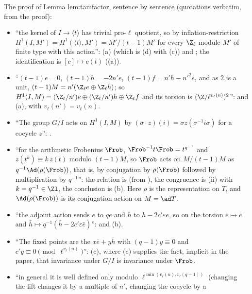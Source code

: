 \begin{paperlink}\label{pl:cohomology:tamfactor}
The proof of Lemma lem:tamfactor, sentence by sentence (quotations verbatim, from the proof):
\begin{itemize}
\item ``the kernel of $I\to\langle t\rangle$ has trivial pro-$\ell$ quotient, so by inflation-restriction $H^1(I,M')=H^1(\langle t\rangle,M')=M'/(t-1)M'$ for every
$\Z_\ell$-module $M'$ of finite type with this action'': (a) (which is (d) with
(c)) and ; the identification is $[c]\mapsto c(t)$ ((a)).
\item ``$(t-1)e=0$, $(t-1)h=-2n'e$, $(t-1)f=n'h-n'^2e$, and as $2$ is a unit, $(t-1)M=n'(\Z_\ell e\oplus\Z_\ell h)$; so
$H^1(I,M)=(\Z_\ell/n')\bar e\oplus(\Z_\ell/n')\bar h\oplus\Z_\ell\bar f$ and its torsion is $(\Z/\ell^{v_\ell(n)})^2$'':  and
(a), with $v_\ell(n')=v_\ell(n)$.
\item ``The group $G/I$ acts on $H^1(I,M)$ by $(\sigma\cdot z)(i)=\sigma z(\sigma^{-1}i\sigma)$ for a cocycle $z$'': .
\item ``for the arithmetic Frobenius $\Frob$, $\Frob^{-1}t\Frob=t^{q^{-1}}$ and $z(t^k)\equiv k\,z(t)$ modulo $(t-1)M$, so $\Frob$ acts on $M/(t-1)M$ as $q^{-1}\Ad(\rho(\Frob))$, that is, by conjugation by $\rho(\Frob)$ followed by multiplication by $q^{-1}$'': the
relation is  (from ), the congruence is (ii) with $k=q^{-1}\in\Zl$, the conclusion is
(b). Here $\rho$ is the representation on $T$, and $\Ad(\rho(\Frob))$ is its conjugation action on $M=\ad T$.
\item ``the adjoint action sends $e$ to $qe$ and $h$ to $h-2c'\varepsilon e$, so on the torsion $\bar e\mapsto\bar e$ and $\bar h\mapsto q^{-1}(\bar h-2c'\varepsilon\bar e)$'':
 and (b).
\item ``The fixed points are the $x\bar e+y\bar h$ with $(q-1)y\equiv0$ and $c'y\equiv0\pmod{\ell^{v_\ell(n)}}$'': (c), where
(c) supplies the fact, implicit in the paper, that invariance under $G/I$ is invariance under $\Frob$.
\item ``in general it is well defined only modulo $\ell^{\min(v_\ell(n),v_\ell(q-1))}$ (changing the lift changes it by a multiple of $n'$, changing the cocycle by a

\end{itemize}
\end{paperlink}
